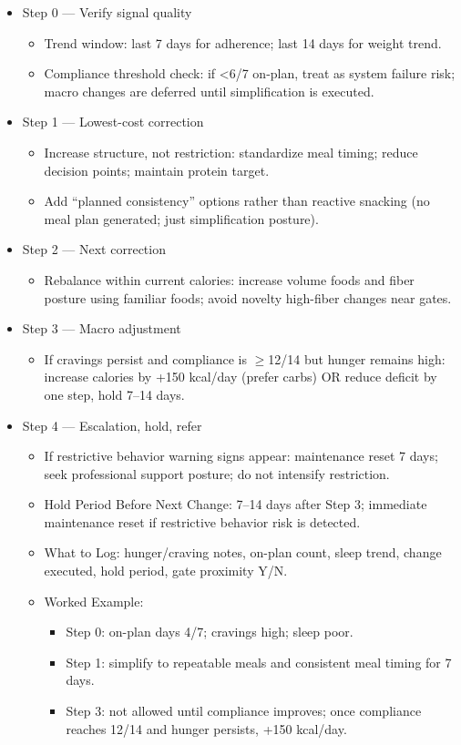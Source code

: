 \documentclass[10pt]{article}
\begin{document}
\begin{itemize}
\item Step 0 — Verify signal quality
  \begin{itemize}
  \item Trend window: last 7 days for adherence; last 14 days for weight trend.
  \item Compliance threshold check: if \textless6/7 on-plan, treat as system failure risk; macro changes are deferred until simplification is executed.
  \end{itemize}
\item Step 1 — Lowest-cost correction
  \begin{itemize}
  \item Increase structure, not restriction: standardize meal timing; reduce decision points; maintain protein target.
  \item Add “planned consistency” options rather than reactive snacking (no meal plan generated; just simplification posture).
  \end{itemize}
\item Step 2 — Next correction
  \begin{itemize}
  \item Rebalance within current calories: increase volume foods and fiber posture using familiar foods; avoid novelty high-fiber changes near gates.
  \end{itemize}
\item Step 3 — Macro adjustment
  \begin{itemize}
  \item If cravings persist and compliance is $\geq$12/14 but hunger remains high: increase calories by +150 kcal/day (prefer carbs) OR reduce deficit by one step, hold 7–14 days.
  \end{itemize}
\item Step 4 — Escalation, hold, refer
  \begin{itemize}
  \item If restrictive behavior warning signs appear: maintenance reset 7 days; seek professional support posture; do not intensify restriction.
  \item Hold Period Before Next Change: 7–14 days after Step 3; immediate maintenance reset if restrictive behavior risk is detected.
  \item What to Log: hunger/craving notes, on-plan count, sleep trend, change executed, hold period, gate proximity Y/N.
  \item Worked Example:
    \begin{itemize}
    \item Step 0: on-plan days 4/7; cravings high; sleep poor.
    \item Step 1: simplify to repeatable meals and consistent meal timing for 7 days.
    \item Step 3: not allowed until compliance improves; once compliance reaches 12/14 and hunger persists, +150 kcal/day.
    \end{itemize}
  \end{itemize}
\end{itemize}
\end{document}
